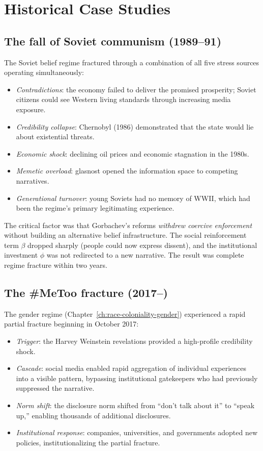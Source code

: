 \section{Historical Case Studies}
\label{sec:ch30-cases}

\subsection{The fall of Soviet communism (1989--91)}

The Soviet belief regime fractured through a combination of all five stress sources operating simultaneously:
\begin{itemize}[nosep]
  \item \emph{Contradictions}: the economy failed to deliver the promised prosperity; Soviet citizens could see Western living standards through increasing media exposure.
  \item \emph{Credibility collapse}: Chernobyl (1986) demonstrated that the state would lie about existential threats.
  \item \emph{Economic shock}: declining oil prices and economic stagnation in the 1980s.
  \item \emph{Memetic overload}: glasnost opened the information space to competing narratives.
  \item \emph{Generational turnover}: young Soviets had no memory of WWII, which had been the regime's primary legitimating experience.
\end{itemize}

The critical factor was that Gorbachev's reforms \emph{withdrew coercive enforcement} without building an alternative belief infrastructure.
The social reinforcement term $\beta$ dropped sharply (people could now express dissent), and the institutional investment $\phi$ was not redirected to a new narrative.
The result was complete regime fracture within two years.

\subsection{The \#MeToo fracture (2017--)}

The gender regime (Chapter~\ref{ch:race-coloniality-gender}) experienced a rapid partial fracture beginning in October 2017:
\begin{itemize}[nosep]
  \item \emph{Trigger}: the Harvey Weinstein revelations provided a high-profile credibility shock.
  \item \emph{Cascade}: social media enabled rapid aggregation of individual experiences into a visible pattern, bypassing institutional gatekeepers who had previously suppressed the narrative.
  \item \emph{Norm shift}: the disclosure norm shifted from ``don't talk about it'' to ``speak up,'' enabling thousands of additional disclosures.
  \item \emph{Institutional response}: companies, universities, and governments adopted new policies, institutionalizing the partial fracture.
\end{itemize}

